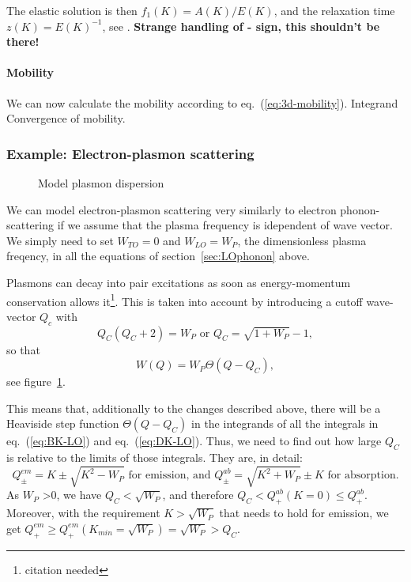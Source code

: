 \documentclass[physics,phd,nolot,nolof]{uccthesis}%
\newcommand{\alert}[1]{\textbf{\color{red}#1}}
\begin{document}
{The elastic solution is then
$f_1(K)= A(K)/E(K)$, 
and the relaxation time $z(K) = E(K)^{-1}$, see \cite[page 388]{RID99}.
\alert{Strange handling of - sign, this shouldn't be there!}
\paragraph*{Mobility}%
We can now calculate the mobility according to eq.~(\ref{eq:3d-mobility}).
Integrand
Convergence of mobility.


\subsubsection{Example: Electron-plasmon scattering}
\begin{figure}[tb]
  \begin{center}
    
  \end{center}
  \caption{Model plasmon dispersion}
  \label{fig:model-plasmon-dispersion}
\end{figure}
We can model electron-plasmon scattering very similarly to 
electron phonon-scattering if we assume that the plasma frequency is
idependent of wave vector.
We simply need to set $W_{TO} = 0$ and $W_{LO}=W_{P}$, the dimensionless
plasma freqency, in all the equations of section~\ref{sec:LOphonon} above.

Plasmons can decay into pair excitations as soon as energy-momentum conservation allows it\footnote{citation needed}.
This is taken into account by introducing a cutoff wave-vector $Q_c$ with
\begin{equation}
  Q_C(Q_C+2) =W_P 
  \text{ or }
  Q_C = \sqrt{1+W_P} -1,
  \label{eq:Qcutoff}
\end{equation}
so that 
\begin{equation}
  W(Q) = W_P\Theta(Q-Q_C),
  \label{eq:cutoff-plasma-dispersion}
\end{equation}
see figure~\ref{fig:model-plasmon-dispersion}.

This means that, additionally to the changes described above, there will 
be a Heaviside step function $\Theta(Q-Q_C)$ in the integrands of all 
the integrals in eq.~(\ref{eq:BK-LO}) and eq.~(\ref{eq:DK-LO}).
Thus, we need to find out how large $Q_C$ is relative to the limits of 
those integrals. 
They are, in detail:
\begin{equation}
  Q^{em}_{\pm} = K \pm \sqrt{K^2 -W_P} 
  \text{ for emission, and }
  Q^{ab}_{\pm} = \sqrt{K^2 +W_P} \pm K
  \text{ for absorption.}
  \label{eq:Qpm}
\end{equation}
As $W_P$ >0, we have $Q_C < \sqrt{W_P}$, and therefore
$Q_C < Q_+^{ab}(K=0) \leq Q_+^{ab}$. 
Moreover, with the requirement $K>\sqrt{W_P}$ that needs to hold for 
emission, we get
$Q^{em}_+\geq Q^{em}_+(K_{min} =\sqrt{W_P}) = \sqrt{W_P} > Q_C$. 

}
\end{document}
